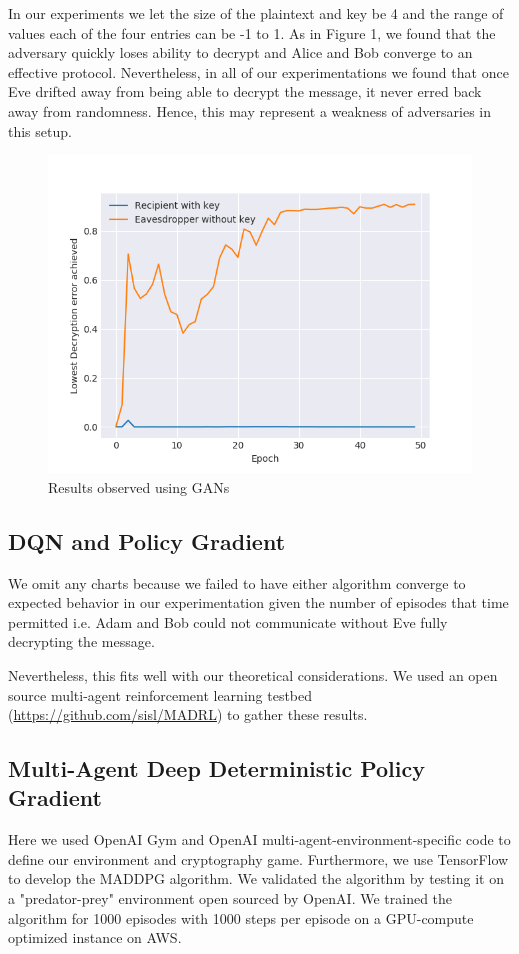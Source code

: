 \documentclass{llncs}
\begin{document}
In our experiments we let the size of the plaintext and key be 4 and the range of values each of the four entries can be -1 to 1. As in Figure 1, we found that the adversary quickly loses ability to decrypt and Alice and Bob converge to an effective protocol. Nevertheless, in all of our experimentations we found that once Eve drifted away from being able to decrypt the message, it never erred back away from randomness. Hence, this may represent a weakness of adversaries in this setup. 

\begin{figure}
  \centering
    \includegraphics[width=\textwidth]{GAN_anc.png}
    \caption{Results observed using GANs}
\end{figure}

\subsection{DQN and Policy Gradient}

We omit any charts because we failed to have either algorithm converge to expected behavior in our experimentation given the number of episodes that time permitted i.e. Adam and Bob could not communicate without Eve fully decrypting the message. 

Nevertheless, this fits well with our theoretical considerations. We used an open source multi-agent reinforcement learning testbed (\url{https://github.com/sisl/MADRL}) to gather these results. 
\subsection{Multi-Agent Deep Deterministic Policy Gradient}
Here we used OpenAI Gym and OpenAI multi-agent-environment-specific code to define our environment and cryptography game. Furthermore, we use TensorFlow to develop the MADDPG algorithm. We validated the algorithm by testing it on a "predator-prey" environment open sourced by OpenAI. We trained the algorithm for 1000 episodes with 1000 steps per episode on a GPU-compute optimized instance on AWS. 
\end{document}
